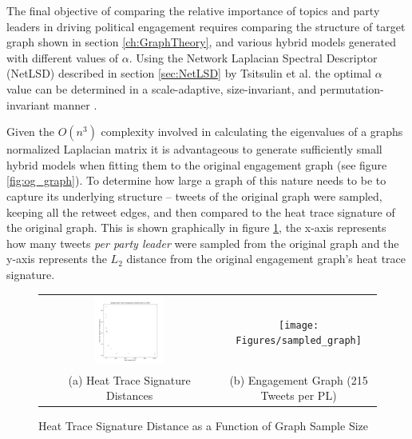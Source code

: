 The final objective of comparing the relative importance of topics and party
leaders in driving political engagement requires comparing the structure of
target graph shown in section \ref{ch:GraphTheory}, and various hybrid models
generated with different values of $\alpha$. Using the Network Laplacian
Spectral Descriptor (NetLSD) described in section \ref{sec:NetLSD} by Tsitsulin
et al. the optimal $\alpha$ value can be determined in a scale-adaptive,
size-invariant, and permutation-invariant manner \cite{netlsd}.

Given the $O(n^{3})$ complexity involved in calculating the eigenvalues of a
graphs normalized Laplacian matrix it is advantageous to generate sufficiently
small hybrid models when fitting them to the original engagement graph (see
figure \ref{fig:og_graph}). To determine how large a graph of this nature needs
to be to capture its underlying structure -- tweets of the original graph were
sampled, keeping all the retweet edges, and then compared to the heat trace
signature of the original graph. This is shown graphically in figure
\ref{fig:dist_from_original_graph_over_sample_size}, the x-axis represents how
many tweets \emph{per party leader} were sampled from the original graph and the
y-axis represents the $L_{2}$ distance from the original engagement graph's heat
trace signature. 

\begin{singlespacing}
    \begin{figure}[H]
    \centering
    \begin{tabular}{cc}
        \includegraphics[width=0.40\textwidth]{Figures/dist_from_original_graph_over_sample_size} &
        \texttt{[image: Figures/sampled\_graph]} \\
        (a) Heat Trace Signature Distances & (b) Engagement Graph (215 Tweets per PL)\\[6pt]
    \end{tabular}
    \caption[Heat Trace Signature Distance as a Function of Graph Sample Size]{Heat Trace Signature Distance as a Function of Graph Sample Size}
    \label{fig:dist_from_original_graph_over_sample_size}
    \end{figure}
\end{singlespacing}

